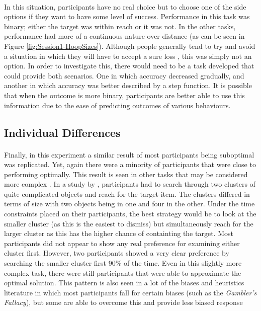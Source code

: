 \documentclass[12pt]{article}
\begin{document}
\paragraph{} In this situation, participants have no real choice but to choose one of the side options if they want to have some level of success. Performance in this task was binary; either the target was within reach or it was not. In the other tasks, performance had more of a continuous nature over distance (as can be seen in Figure \ref{fig:Session1-HoopSizes}). Although people generally tend to try and avoid a situation in which they will have to accept a sure loss \citep{KahnemanProspect}, this was simply not an option. In order to investigate this, there would need to be a task developed that could provide both scenarios. One in which accuracy decreased gradually, and another in which accuracy was better described by a step function. It is possible that when the outcome is more binary, participants are better able to use this information due to the ease of predicting outcomes of various behaviours. 

\subsection*{Individual Differences}
\paragraph{} Finally, in this experiment a similar result of most participants being suboptimal was replicated. Yet, again there were a minority of participants that were close to performing optimally. This result is seen in other tasks that may be considered more complex \citep{Zhang2012handeye}. In a study by \cite{Zhang2012handeye}, participants had to search through two clusters of quite complicated objects and reach for the target item. The clusters differed in terms of size with two objects being in one and four in the other. Under the time constraints placed on their participants, the best strategy would be to look at the smaller cluster (as this is the easiest to dismiss) but simultaneously reach for the larger cluster as this has the higher chance of containting the target. Most participants did not appear to show any real preference for examining either cluster first. However, two participants showed a very clear preference by searching the smaller cluster first 90\% of the time. Even in this slightly more complex task, there were still participants that were able to approximate the optimal solution. This pattern is also seen in a lot of the biases and heuristics literature in which most participants fall for certain biases (such as the \textit{Gambler's Fallacy}), but some are able to overcome this and provide less biased response \cite{stanovich2008relative}
\end{document}
